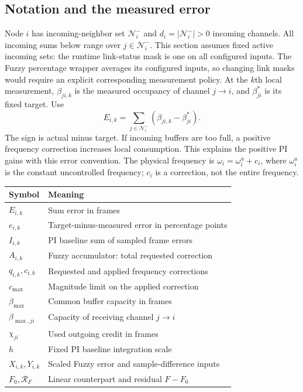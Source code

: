 \subsection{Notation and the measured error}

Node $i$ has incoming-neighbor set $\mathcal N_i^-$ and $d_i=|\mathcal N_i^-|>0$ incoming channels. All incoming sums below range over $j\in\mathcal N_i^-$. This section assumes fixed active
incoming sets: the runtime link-status mask is one on all configured inputs.
The Fuzzy percentage wrapper averages its configured inputs, so changing
link masks would require an explicit corresponding measurement policy.
At the $k$th local measurement,
$\beta_{ji,k}$ is the measured occupancy of channel $j\to i$, and
$\beta^*_{ji}$ is its fixed target. Use
\begin{equation}
 E_{i,k}=\sum_{j\in\mathcal N_i^-}(\beta_{ji,k}-\beta^*_{ji}).
 \label{detail:eq:fpi_error}
\end{equation}
The sign is actual minus target. If incoming buffers are too full, a
positive frequency correction increases local consumption. This explains
the positive PI gains with this error convention. The physical frequency is $\omega_i=\omega_i^u+c_i$, where $\omega_i^u$ is the constant uncontrolled frequency; $c_i$ is a correction, not the entire frequency.

\begin{center}
\begin{tabular}{@{}ll@{}}
\toprule
Symbol & Meaning \\
\midrule
$E_{i,k}$ & Sum error in frames \\
$e_{i,k}$ & Target-minus-measured error in percentage points \\
$I_{i,k}$ & PI baseline sum of sampled frame errors \\
$A_{i,k}$ & Fuzzy accumulator: total requested correction \\
$q_{i,k},c_{i,k}$ & Requested and applied frequency corrections \\
$c_{\max}$ & Magnitude limit on the applied correction \\
$\beta_{\max}$ & Common buffer capacity in frames \\
$\beta_{\max,ji}$ & Capacity of receiving channel $j\to i$ \\
$\chi_{ji}$ & Used outgoing credit in frames \\
$h$ & Fixed PI baseline integration scale \\
$X_{i,k},Y_{i,k}$ & Scaled Fuzzy error and sample-difference inputs \\
$F_0,\mathcal R_F$ & Linear counterpart and residual $F-F_0$ \\
\bottomrule
\end{tabular}
\end{center}

